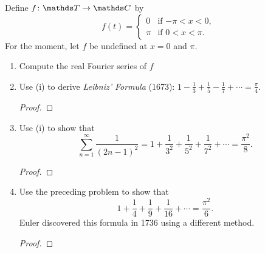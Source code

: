 \documentclass{../homework}
\date{Thursday 4/25}
\author{}
\begin{document}
\begin{Exercise}
  Define \(f\colon\T\to\C\) by
  \[
    f(t) =
    \begin{cases}
      0 & \text{if \(-\pi < x < 0\),} \\
      \pi & \text{if \(0 < x < \pi\).}
    \end{cases}
  \]
  For the moment, let \(f\) be undefined at \(x = 0\) and \(\pi\).
  \begin{enumerate}
  \item Compute the real Fourier series of \(f\)

    \begin{solution}

    \end{solution}

  \item Use (i) to derive \emph{Leibniz' Formula} (1673):
    \(\displaystyle 1 - \frac{1}{3} + \frac{1}{5} - \frac{1}{7} +
    \cdots = \frac{\pi}{4}\).

    \begin{solution}
      \begin{proof}

      \end{proof}
    \end{solution}

  \item Use (i) to show that
    \[
      \sum_{n=1}^{\infty} \frac{1}{(2n-1)^2}
      = 1 + \frac{1}{3^2} + \frac{1}{5^2} + \frac{1}{7^2} + \cdots
      = \frac{\pi^2}{8}.
    \]

    \begin{solution}
      \begin{proof}

      \end{proof}
    \end{solution}

  \item Use the preceding problem to show that
    \[
      1 + \frac{1}{4} + \frac{1}{9} + \frac{1}{16} + \cdots
      = \frac{\pi^2}{6}.
    \]
    Euler discovered this formula in 1736 using a different method.

    \begin{solution}
      \begin{proof}

      \end{proof}
    \end{solution}
  \end{enumerate}
\end{Exercise}
\end{document}
